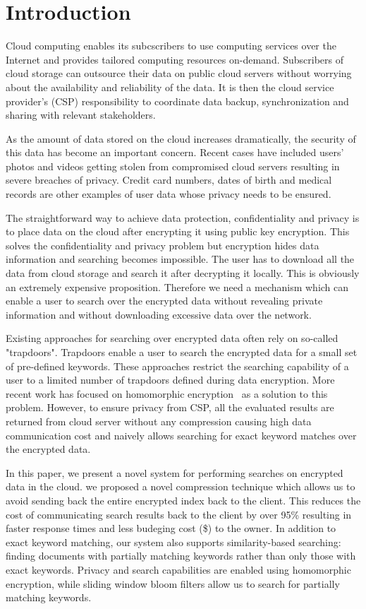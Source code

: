 \section{Introduction}

Cloud computing enables its subcscribers to use computing services over the 
Internet and provides tailored computing resources on-demand. 
Subscribers of cloud storage can outsource their data on public cloud servers
without worrying about the availability and
reliability of the data. It is then the cloud service provider's (CSP) 
responsibility to coordinate data backup, synchronization and sharing
with relevant stakeholders. 

As the amount of data stored on the cloud increases dramatically, the security 
of this data has become an important concern. Recent cases have included users'
photos and videos getting stolen from compromised cloud servers resulting in
severe breaches of privacy. Credit card numbers, dates of birth and medical
records are other examples of user data whose privacy needs to be ensured.

The straightforward way to achieve data protection, confidentiality and privacy is to place data on the cloud after encrypting it using public key encryption. 
This solves the confidentiality and privacy problem
but encryption hides data information and searching becomes impossible. The user has to download all
the data from cloud storage and search it after decrypting it locally. This is
obviously an extremely expensive proposition. Therefore we need a mechanism 
which can enable a user to search over the encrypted data without revealing 
private information and without downloading excessive data over the network.

Existing approaches for searching over encrypted data often rely on so-called
"trapdoors". Trapdoors enable a user to search the encrypted data for a small 
set of pre-defined keywords. These approaches restrict the searching
capability of a user to a limited number of trapdoors defined during data 
encryption. More recent work has focused on homomorphic encryption~\cite{craig} as a solution
to this problem. However, to ensure privacy from CSP, all the evaluated results are returned from cloud server without any compression causing high data communication cost and naively allows searching for exact keyword matches over the encrypted data. 

In this paper, we present a novel system for performing searches on encrypted 
data in the cloud. we proposed a novel compression technique which allows us to avoid sending back the
entire encrypted index back to the client. This reduces the cost of
communicating search results back to the client by over 95\% resulting in 
faster response times and less budeging cost (\$) to the owner. In addition to exact keyword matching, our system also
supports similarity-based searching: finding documents with partially matching 
keywords rather than only those with exact keywords. Privacy and search 
capabilities are enabled using homomorphic encryption, while sliding window 
bloom filters allow us to search for partially matching keywords. 

